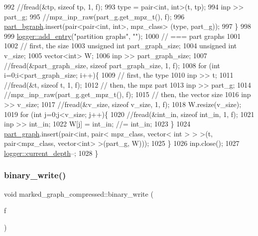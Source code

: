 \begin{DoxyCode}
992     \textcolor{comment}{//fread(&tp, sizeof tp, 1, f);}
993     type = pair<int, int>(t, tp);
994     inp >> part\_g;
995     \textcolor{comment}{//mpz\_inp\_raw(part\_g.get\_mpz\_t(), f);}
996     \hyperlink{classmarked__graph__compressed_a7b3267063fba30b45eb21b3ba4e07536}{part\_bgraph}.insert(pair<pair<int, int>, mpz\_class> (type, part\_g));
997   \}
998 
999   \hyperlink{classlogger_a710163deb17bc81f70d53d285b8ac9ac}{logger::add\_entry}(\textcolor{stringliteral}{"partition graphs"}, \textcolor{stringliteral}{""});
1000   \textcolor{comment}{// === part graphs}
1001 
1002   \textcolor{comment}{// first, the size}
1003   \textcolor{keywordtype}{unsigned} \textcolor{keywordtype}{int} part\_graph\_size;
1004   \textcolor{keywordtype}{unsigned} \textcolor{keywordtype}{int} v\_size;
1005   vector<int> W; 
1006   inp >> part\_graph\_size;
1007   \textcolor{comment}{//fread(&part\_graph\_size, sizeof part\_graph\_size, 1, f);}
1008   \textcolor{keywordflow}{for} (\textcolor{keywordtype}{int} i=0;i<part\_graph\_size; i++)\{
1009     \textcolor{comment}{// first, the type}
1010     inp >> t; 
1011     \textcolor{comment}{//fread(&t, sizeof t, 1, f);}
1012     \textcolor{comment}{// then, the mpz part}
1013     inp >> part\_g;
1014     \textcolor{comment}{//mpz\_inp\_raw(part\_g.get\_mpz\_t(), f);}
1015     \textcolor{comment}{// then, the vector size}
1016     inp >> v\_size;
1017     \textcolor{comment}{//fread(&v\_size, sizeof v\_size, 1, f);}
1018     W.resize(v\_size);
1019     \textcolor{keywordflow}{for} (\textcolor{keywordtype}{int} j=0;j<v\_size; j++)\{
1020       \textcolor{comment}{//fread(&int\_in, sizeof int\_in, 1, f);}
1021       inp >> int\_in;
1022       W[j] = int\_in; \textcolor{comment}{//= int\_in;}
1023     \}
1024     \hyperlink{classmarked__graph__compressed_ae179a4737e6eab905c18a94d44ef64b7}{part\_graph}.insert(pair<\textcolor{keywordtype}{int}, pair< mpz\_class, vector< int > > >(t, pair<mpz\_class, vector<int>
       >(part\_g, W)));
1025   \}
1026   inp.close();
1027   \hyperlink{classlogger_a9d29b49bd318a719a8e85b59eac54fe0}{logger::current\_depth}--;
1028 \}
\end{DoxyCode}
\mbox{\label{classmarked__graph__compressed_ab9cdb7fc43badd58fb5202f74ffac723}} 
\subsubsection{\texorpdfstring{binary\+\_\+write()}{binary\_write()}\hspace{0.1cm}{\footnotesize\ttfamily [1/2]}}
{\footnotesize\ttfamily void marked\+\_\+graph\+\_\+compressed\+::binary\+\_\+write (\begin{DoxyParamCaption}\item[{F\+I\+LE $\ast$}]{f }\end{DoxyParamCaption})}



